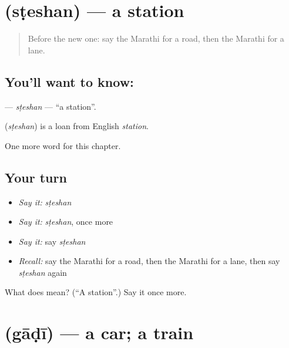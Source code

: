 \section[\texorpdfstring{\mr{स्टेशन} (sṭeshan)}{स्टेशन (sṭeshan)}]{ (sṭeshan) — a station}

\label{lesson:MR-C113-steshan}



\begin{quote}
Before the new one: say the Marathi for a road, then the Marathi for a lane.
\end{quote}

\subsection*{You'll want to know: }
\textbf{} — \emph{sṭeshan} — \textquotedblleft{}a station\textquotedblright{}.

\begin{cousinweb}
\textbf{} (\emph{sṭeshan}) is a loan from English \emph{station}.
\end{cousinweb}

\begin{grammarlens}[title={What you've built}]
One more word for this chapter.
\end{grammarlens}

\subsection*{Your turn}
\begin{itemize}
\raggedright
  \item \emph{Say it:} \emph{sṭeshan}
  \item \emph{Say it:} \emph{sṭeshan}, once more
  \item \emph{Say it:} say \emph{sṭeshan}
  \item \emph{Recall:} say the Marathi for a road, then the Marathi for a lane, then say \emph{sṭeshan} again
\end{itemize}

\begin{tcolorbox}[breakable,colback=teal!4,colframe=teal!35!black,title={Before you move on}]
What does  mean? (\textquotedblleft{}A station\textquotedblright{}.) Say it once more.
\end{tcolorbox}
\section[\texorpdfstring{\mr{गाडी} (gāḍī)}{गाडी (gāḍī)}]{ (gāḍī) — a car; a train}

